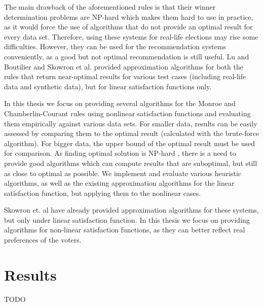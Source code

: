 The main drawback of the aforementioned rules is that their winner determination problems are NP-hard \cite{3, 4, 2} which makes them hard to use in practice, as it would force the use of algorithms that do not provide an optimal result for every data set. Therefore, using these systems for real-life elections may rise some difficulties. However, they can be used for the recommendation systems conveniently, as a good but not optimal recommendation is still useful. Lu and Boutilier \cite{4} and Skowron et al. \cite{1} provided approximation algorithms for both the rules that return near-optimal results for various test cases (including real-life data and synthetic data), but for linear satisfaction functions only.

In this thesis we focus on providing several algorithms for the Monroe and Chamberlin-Courant rules using nonlinear satisfaction functions and evaluating them empirically against various data sets. For smaller data, results can be easily assessed by comparing them to the optimal result (calculated with the brute-force algorithm). For bigger data, the upper bound of the optimal result must be used for comparison. As finding optimal solution is NP-hard \cite{3, 4, 2}, there is a need to provide good algorithms which can compute results that are suboptimal, but still as close to optimal as possible. We implement and evaluate various heuristic algorithms, as well as the existing approximation algorithms for the linear satisfaction function, but applying them to the nonlinear cases.

Skowron et. al \cite{1} have already provided approximation algorithms for these systems, but only under linear satisfaction function. In this thesis we focus on providing algorithms for non-linear satisfaction functions, as they can better reflect real preferences of the voters.

\section{Results}

TODO
